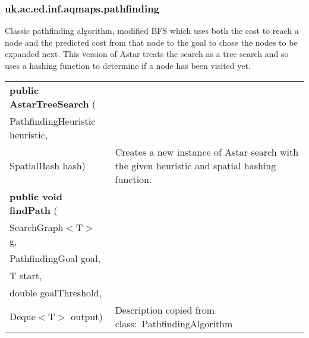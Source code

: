 \subsubsection{ uk.ac.ed.inf.aqmaps.pathfinding }
 { Classic pathfinding algorithm, modified BFS which uses both the cost to reach a node and the predicted cost from that node to the goal\newline%
 to chose the nodes to be expanded next. This version of Astar treats the search as a tree search and so uses a hashing function to determine if a node has been visited yet.
 
\begin{tabular}{ p{3in}|m{3.4in}}
\textbf{public AstarTreeSearch } (\\ \hspace*{ 5pt} PathfindingHeuristic heuristic,\\\hspace*{ 5pt} SpatialHash hash) & Creates a new instance of Astar search with the given heuristic and spatial hashing function.\\ \hline 
\textbf{public void findPath } (\\ \hspace*{ 5pt} SearchGraph$<$T$>$ g,\\\hspace*{ 5pt} PathfindingGoal goal,\\\hspace*{ 5pt} T start,\\\hspace*{ 5pt} double goalThreshold,\\\hspace*{ 5pt} Deque$<$T$>$ output) & Description copied from class:~PathfindingAlgorithm\\ \hline 
\end{tabular}
}

